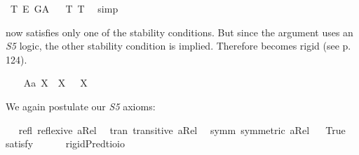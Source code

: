 \begin{isabellebody}
\isamarkupfalse%
\ T{}{\isacharcolon}\ {\isachardoublequoteopen}{\isasymlfloor}\isactrlbold {\isasymdiamond}\isactrlbold {\isasymexists}\isactrlsup E\ G\isactrlsup A{\isasymrfloor}{\isachardoublequoteclose}%
\isadelimproof
\ %
\endisadelimproof
%
\isatagproof
{}\isamarkupfalse%
\ T{}\ T{}\ \isamarkupfalse%
\ simp\ \ %
%
\endisatagproof
{\isafoldproof}%
%
\isadelimproof
%
\endisadelimproof
%
\isamarkuptrue%
%
\begin{isamarkuptext}%
\isa{{\isasymP}} now satisfies only one of the stability conditions. But since the argument uses an \emph{S5} logic, 
the other stability condition is implied. Therefore \isa{{\isasymP}} becomes rigid (see p. 124).%
\end{isamarkuptext}\isamarkuptrue%
\isamarkupfalse%
\ \isanewline
\ \ A{}a{\isacharcolon}\ {\isachardoublequoteopen}{\isasymlfloor}\isactrlbold {\isasymforall}X{\isachardot}\ {\isasymP}\ X\ \isactrlbold {\isasymrightarrow}\ \isactrlbold {\isasymbox}{\isacharparenleft}{\isasymP}\ X{\isacharparenright}{\isasymrfloor}{\isachardoublequoteclose}\ \ \ \ \ \ %
%
\begin{isamarkuptext}%
We again postulate our \emph{S5} axioms:%
\end{isamarkuptext}\isamarkuptrue%
\isamarkupfalse%
\ \isanewline
\ refl{\isacharcolon}\ {\isachardoublequoteopen}reflexive\ aRel{\isachardoublequoteclose}\ \isanewline
\ tran{\isacharcolon}\ {\isachardoublequoteopen}transitive\ aRel{\isachardoublequoteclose}\ \isanewline
\ symm{\isacharcolon}\ {\isachardoublequoteopen}symmetric\ aRel{\isachardoublequoteclose}\isanewline
\ \isanewline
{}\isamarkupfalse%
\ True\ \isamarkupfalse%
{\isacharbrackleft}satisfy{\isacharbrackright}%
\isadelimproof
\ %
\endisadelimproof
%
\isatagproof
{}\isamarkupfalse%
\ %
%
\endisatagproof
{\isafoldproof}%
%
\isadelimproof
%
\endisadelimproof
\isanewline
\ \isanewline
{}\isamarkupfalse%
\ rigidPred{\isacharcolon}{\isacharcolon}{\isachardoublequoteopen}{\isacharparenleft}{\isacharprime}t{\isasymRightarrow}io{\isacharparenright}{\isasymRightarrow}io{\isachardoublequoteclose}\ \isanewline

\end{isabellebody}
